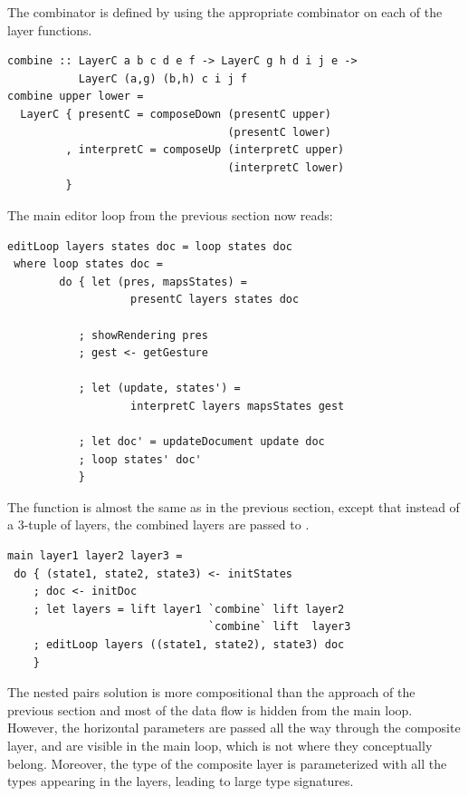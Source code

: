\documentclass[preprint,natbib]{sigplanconf}
\begin{document}
The  combinator is defined by using the appropriate  combinator on each of the layer functions. 

\begin{small}
\begin{verbatim}
combine :: LayerC a b c d e f -> LayerC g h d i j e -> 
           LayerC (a,g) (b,h) c i j f
combine upper lower =
  LayerC { presentC = composeDown (presentC upper) 
                                  (presentC lower)
         , interpretC = composeUp (interpretC upper) 
                                  (interpretC lower)
         }
\end{verbatim}
\end{small}



The main editor loop from the previous section now reads:
 
\begin{small}
\begin{verbatim}
editLoop layers states doc = loop states doc
 where loop states doc = 
        do { let (pres, mapsStates) = 
                   presentC layers states doc
           
           ; showRendering pres
           ; gest <- getGesture
 
           ; let (update, states') = 
                   interpretC layers mapsStates gest
       
           ; let doc' = updateDocument update doc
           ; loop states' doc'
           }
\end{verbatim}
\end{small}

The  function is almost the same as in the previous section, except that instead of a 3-tuple of layers, the combined layers are passed to . 

\begin{small}
\begin{verbatim}
main layer1 layer2 layer3 = 
 do { (state1, state2, state3) <- initStates
    ; doc <- initDoc 
    ; let layers = lift layer1 `combine` lift layer2 
                               `combine` lift  layer3
    ; editLoop layers ((state1, state2), state3) doc
    }
\end{verbatim}
\end{small}


The nested pairs solution is more compositional than the approach of the previous section and most of the data flow is hidden from the main loop. However, the horizontal parameters are passed all the way through the composite layer, and are visible in the main loop, which is not where they conceptually belong. Moreover, the type of the composite layer is parameterized with all the types appearing in the layers, leading to large type signatures.
\end{document}
